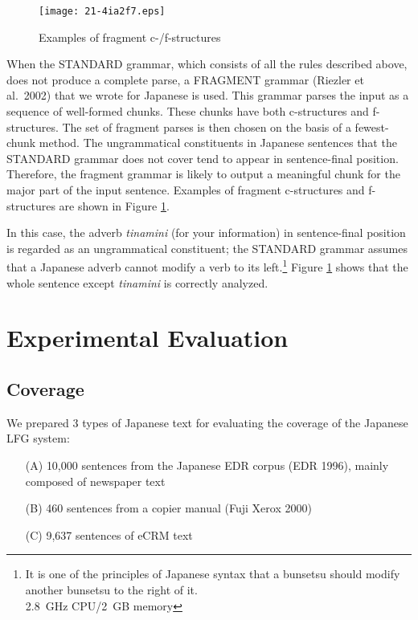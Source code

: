 \documentclass[english]{jnlp_1.4_rep}
\begin{document}
\begin{figure}[b] 
\begin{center}
\texttt{[image: 21-4ia2f7.eps]}
\end{center}
\caption{Examples of fragment c-/f-structures}
\label{paclic_fig4}
\end{figure}

When the STANDARD grammar, which consists of all the rules described
above, does not produce a complete parse, a FRAGMENT grammar (Riezler
et al.\ 2002) that we wrote for Japanese is used.  This grammar parses the
input as a sequence of well-formed chunks.  These chunks have both
c-structures and f-structures.  The set of fragment parses is then
chosen on the basis of a fewest-chunk method.
The ungrammatical constituents in Japanese sentences that the STANDARD
grammar does not cover tend to appear in sentence-final position.
Therefore, the fragment grammar is likely to output a meaningful chunk
for the major part of the input sentence.  Examples of fragment
c-structures and f-structures are shown in Figure \ref{paclic_fig4}.  

In this case, the adverb \textit{tinamini} (for your information) in
sentence-final position is regarded as an ungrammatical constituent;
the STANDARD grammar assumes that a Japanese adverb cannot modify a
verb to its left.\footnote{It is one of the principles of
Japanese syntax that a bunsetsu should modify another bunsetsu to the
right of it.\\2.8~GHz CPU/2~GB memory}  Figure \ref{paclic_fig4} shows that the whole sentence
except \textit{tinamini} is correctly analyzed.




\section{Experimental Evaluation}

\subsection{Coverage}
\label{Coverage}

We prepared 3 types of Japanese text for evaluating the coverage of the Japanese LFG system:  
\begin{itemize}
\item[(A)]{ 10,000 sentences from the Japanese EDR corpus (EDR 1996), mainly composed of newspaper text}
\item[(B)]{ 460 sentences from a copier manual (Fuji Xerox 2000)} 
\item[(C)]{ 9,637 sentences of eCRM text}  
\end{itemize}
\end{document}
